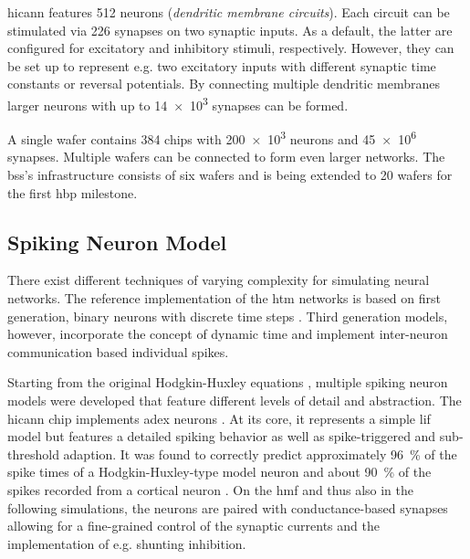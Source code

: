 \gls{hicann} features 512 neurons (\emph{dendritic membrane circuits}). Each circuit can be stimulated via 226 synapses on two synaptic inputs. As a default, the latter are configured for excitatory and inhibitory stimuli, respectively. However, they can be set up to represent e.g. two excitatory inputs with different synaptic time constants or reversal potentials. By connecting multiple dendritic membranes larger neurons with up to \num{14e3} synapses can be formed.

A single wafer contains 384 chips with \num{200e3} neurons and \num{45e6} synapses. Multiple wafers can be connected to form even larger networks. The \gls{bss}'s infrastructure consists of six wafers and is being extended to 20 wafers for the first \gls{hbp} milestone.

%
%

\subsection{Spiking Neuron Model}

There exist different techniques of varying complexity for simulating neural networks. The reference implementation of the \gls{htm} networks is based on first generation, binary neurons with discrete time steps \citep{nupic}. Third generation models, however, incorporate the concept of dynamic time and implement inter-neuron communication based individual spikes.

Starting from the original Hodgkin-Huxley equations \citep{Hodgkin1952}, multiple spiking neuron models were developed that feature different levels of detail and abstraction. The \gls{hicann} chip implements \gls{adex} neurons \citep{brette2005adaptive}. At its core, it represents a simple \gls{lif} model but features a detailed spiking behavior as well as spike-triggered and sub-threshold adaption. It was found to correctly predict approximately \SI{96}{\%} of the spike times of a Hodgkin-Huxley-type model neuron and about \SI{90}{\%} of the spikes recorded from a cortical neuron \citep{jolivet2008quantitative}. On the \gls{hmf} and thus also in the following simulations, the neurons are paired with conductance-based synapses allowing for a fine-grained control of the synaptic currents and the implementation of e.g. shunting inhibition.
